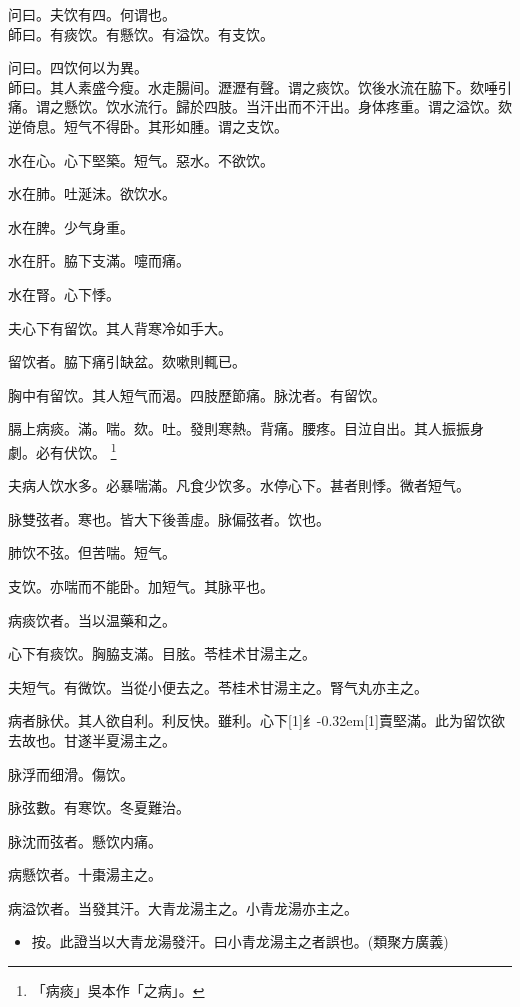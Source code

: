 \documentclass[11pt,oneside,b5paper]{ctexbook}
\begin{document}
\begin{flushleft}
问曰。夫饮有四。何谓也。\\
師曰。有痰饮。有懸饮。有溢饮。有支饮。

问曰。四饮何以为異。\\
師曰。其人素盛今瘦。水走腸间。瀝瀝有聲。谓之痰饮。饮後水流在脇下。欬唾引痛。谓之懸饮。饮水流行。歸於四肢。当汗出而不汗出。身体疼重。谓之溢饮。欬逆倚息。短气不得卧。其形如腫。谓之支饮。

水在心。心下堅築。短气。惡水。不欲饮。

水在肺。吐涎沫。欲饮水。

水在脾。少气身重。

水在肝。脇下支滿。嚏而痛。

水在腎。心下悸。

夫心下有留饮。其人背寒冷如手大。

留饮者。脇下痛引缺盆。欬嗽則輒已。

胸中有留饮。其人短气而渴。四肢歷節痛。脉沈者。有留饮。

膈上病痰。滿。喘。欬。吐。發則寒熱。背痛。腰疼。目泣自出。其人振振身{𥆧}劇。必有伏饮。
\footnote{「病痰」吳本作「之病」。}

夫病人饮水多。必暴喘滿。凡食少饮多。水停心下。甚者則悸。微者短气。

脉雙弦者。寒也。皆大下後善虛。脉偏弦者。饮也。

肺饮不弦。但苦喘。短气。

支饮。亦喘而不能卧。加短气。其脉平也。

病痰饮者。当以温藥和之。

心下有痰饮。胸脇支滿。目胘。苓桂术甘湯主之。

夫短气。有微饮。当從小便去之。苓桂术甘湯主之。腎气丸亦主之。

病者脉伏。其人欲自利。利反快。雖利。心下{\hbox{\scalebox{0.6}[1]{纟}\kern-0.32em\scalebox{0.7}[1]{賣}}}堅滿。此为留饮欲去故也。甘遂半夏湯主之。

脉浮而细滑。傷饮。

脉弦數。有寒饮。冬夏難治。

脉沈而弦者。懸饮内痛。

病懸饮者。十棗湯主之。

病溢饮者。当發其汗。大青龙湯主之。小青龙湯亦主之。

\begin{itemize}
\item 按。此證当以大青龙湯發汗。曰小青龙湯主之者誤也。(類聚方廣義)
\end{itemize}


\end{flushleft}
\end{document}
